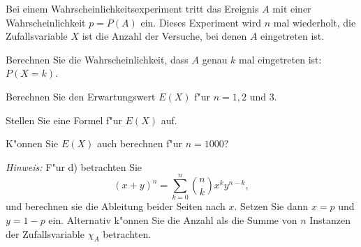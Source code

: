 Bei einem Wahrscheinlichkeitsexperiment tritt das Ereignis $A$
mit einer Wahrscheinlichkeit $p=P(A)$ ein. Dieses Experiment wird
$n$ mal wiederholt, die Zufallsvariable $X$ ist die Anzahl der
Versuche, bei denen $A$ eingetreten ist.
\begin{teilaufgaben}
\item Berechnen Sie die Wahrscheinlichkeit, dass $A$ genau $k$
mal eingetreten ist: $P(X=k)$.
\item Berechnen Sie den Erwartungswert $E(X)$ f"ur $n=1,2$ und $3$.
\item Stellen Sie eine Formel f"ur $E(X)$ auf.
\item K"onnen Sie $E(X)$ auch berechnen f"ur $n=1000$?
\end{teilaufgaben}
{\it Hinweis:} F"ur d) betrachten Sie
\[
(x+y)^n=\sum_{k=0}^n\binom{n}{k}x^ky^{n-k},
\]
und berechnen sie die Ableitung beider Seiten nach $x$.
Setzen Sie dann $x=p$ und $y=1-p$ ein. Alternativ k"onnen Sie die
Anzahl als die Summe von $n$ Instanzen der Zufallsvariable $\chi_A$
betrachten.

